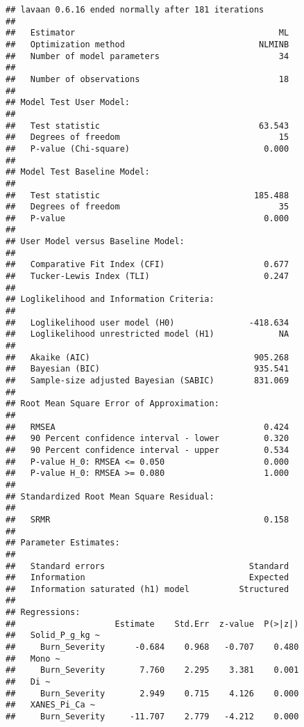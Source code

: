 \documentclass[
]{article}
\begin{document}
\begin{verbatim}
## lavaan 0.6.16 ended normally after 181 iterations
## 
##   Estimator                                         ML
##   Optimization method                           NLMINB
##   Number of model parameters                        34
## 
##   Number of observations                            18
## 
## Model Test User Model:
##                                                       
##   Test statistic                                63.543
##   Degrees of freedom                                15
##   P-value (Chi-square)                           0.000
## 
## Model Test Baseline Model:
## 
##   Test statistic                               185.488
##   Degrees of freedom                                35
##   P-value                                        0.000
## 
## User Model versus Baseline Model:
## 
##   Comparative Fit Index (CFI)                    0.677
##   Tucker-Lewis Index (TLI)                       0.247
## 
## Loglikelihood and Information Criteria:
## 
##   Loglikelihood user model (H0)               -418.634
##   Loglikelihood unrestricted model (H1)             NA
##                                                       
##   Akaike (AIC)                                 905.268
##   Bayesian (BIC)                               935.541
##   Sample-size adjusted Bayesian (SABIC)        831.069
## 
## Root Mean Square Error of Approximation:
## 
##   RMSEA                                          0.424
##   90 Percent confidence interval - lower         0.320
##   90 Percent confidence interval - upper         0.534
##   P-value H_0: RMSEA <= 0.050                    0.000
##   P-value H_0: RMSEA >= 0.080                    1.000
## 
## Standardized Root Mean Square Residual:
## 
##   SRMR                                           0.158
## 
## Parameter Estimates:
## 
##   Standard errors                             Standard
##   Information                                 Expected
##   Information saturated (h1) model          Structured
## 
## Regressions:
##                    Estimate    Std.Err  z-value  P(>|z|)
##   Solid_P_g_kg ~                                        
##     Burn_Severity      -0.684    0.968   -0.707    0.480
##   Mono ~                                                
##     Burn_Severity       7.760    2.295    3.381    0.001
##   Di ~                                                  
##     Burn_Severity       2.949    0.715    4.126    0.000
##   XANES_Pi_Ca ~                                         
##     Burn_Severity     -11.707    2.779   -4.212    0.000

\end{verbatim}
\end{document}
